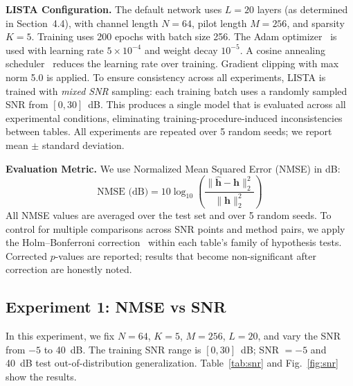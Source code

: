 \documentclass[a4paper,fleqn]{cas-sc}
\begin{document}
\textbf{LISTA Configuration.} The default network uses $L=20$ layers (as determined in Section~4.4), with channel length $N=64$, pilot length $M=256$, and sparsity $K=5$. Training uses 200 epochs with batch size 256. The Adam optimizer~\citep{kingma2015adam} is used with learning rate $5 \times 10^{-4}$ and weight decay $10^{-5}$. A cosine annealing scheduler~\citep{loshchilov2017sgdr} reduces the learning rate over training. Gradient clipping with max norm 5.0 is applied. To ensure consistency across all experiments, LISTA is trained with \emph{mixed SNR} sampling: each training batch uses a randomly sampled SNR from $[0, 30]$~dB. This produces a single model that is evaluated across all experimental conditions, eliminating training-procedure-induced inconsistencies between tables. All experiments are repeated over 5 random seeds; we report mean $\pm$ standard deviation.

\textbf{Evaluation Metric.} We use Normalized Mean Squared Error (NMSE) in dB:
\begin{equation}
\text{NMSE (dB)} = 10 \log_{10}\left(\frac{\|\hat{\mathbf{h}} - \mathbf{h}\|_2^2}{\|\mathbf{h}\|_2^2}\right)
\end{equation}
All NMSE values are averaged over the test set and over 5 random seeds. To control for multiple comparisons across SNR points and method pairs, we apply the Holm--Bonferroni correction~\citep{holm1979simple} within each table's family of hypothesis tests. Corrected $p$-values are reported; results that become non-significant after correction are honestly noted.

\subsection{Experiment 1: NMSE vs SNR}

In this experiment, we fix $N=64$, $K=5$, $M=256$, $L=20$, and vary the SNR from $-5$ to 40~dB. The training SNR range is $[0, 30]$~dB; SNR $= -5$ and 40~dB test out-of-distribution generalization. Table~\ref{tab:snr} and Fig.~\ref{fig:snr} show the results.
\end{document}
